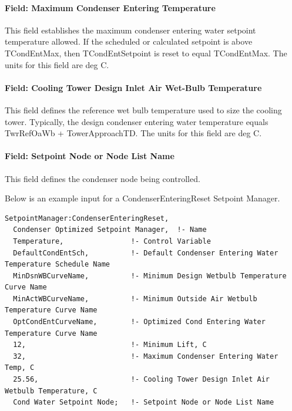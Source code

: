 \paragraph{Field: Maximum Condenser Entering Temperature}\label{field-maximum-condenser-entering-temperature}

This field establishes the maximum condenser entering water setpoint temperature allowed. If the scheduled or calculated setpoint is above TCondEntMax, then TCondEntSetpoint is reset to equal TCondEntMax. The units for this field are deg C.

\paragraph{Field: Cooling Tower Design Inlet Air Wet-Bulb Temperature}\label{field-cooling-tower-design-inlet-air-wet-bulb-temperature}

This field defines the reference wet bulb temperature used to size the cooling tower. Typically, the design condenser entering water temperature equals TwrRefOaWb + TowerApproachTD. The units for this field are deg C.

\paragraph{Field: Setpoint Node or Node List Name}\label{field-setpoint-node-or-node-list-name}

This field defines the condenser node being controlled.

Below is an example input for a CondenserEnteringReset Setpoint Manager.

\begin{lstlisting}
SetpointManager:CondenserEnteringReset,
  Condenser Optimized Setpoint Manager,  !- Name
  Temperature,                !- Control Variable
  DefaultCondEntSch,          !- Default Condenser Entering Water Temperature Schedule Name
  MinDsnWBCurveName,          !- Minimum Design Wetbulb Temperature Curve Name
  MinActWBCurveName,          !- Minimum Outside Air Wetbulb Temperature Curve Name
  OptCondEntCurveName,        !- Optimized Cond Entering Water Temperature Curve Name
  12,                         !- Minimum Lift, C
  32,                         !- Maximum Condenser Entering Water Temp, C
  25.56,                      !- Cooling Tower Design Inlet Air Wetbulb Temperature, C
  Cond Water Setpoint Node;   !- Setpoint Node or Node List Name
\end{lstlisting}

